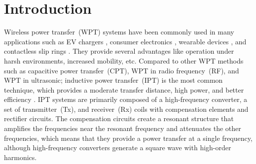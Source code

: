 \documentclass[journal]{IEEEtran}
\begin{document}
\section{Introduction}
Wireless power transfer~(WPT) systems have been commonly used in many applications such as EV chargers \cite{EV_charging}, consumer electronics \cite{consumer_electronics}, wearable devices \cite{wearable_devices}, and contactless slip rings \cite{CET}. 
They provide several advantages like operation under harsh environments, increased mobility, etc.
Compared to other WPT methods such as capacitive power transfer~(CPT), WPT in radio frequency~(RF), and WPT in ultrasonic;  inductive power transfer~(IPT) is the most common technique, which provides a moderate transfer distance, high power, and better efficiency \cite{CPT-RF}.
IPT systems are primarily composed of a high-frequency converter, a set of transmitter~(Tx), and receiver~(Rx) coils with compensation elements and rectifier circuits. 
The compensation circuits create a resonant structure that amplifies the frequencies near the resonant frequency and attenuates the other frequencies, which means that they provide a power transfer at a single frequency, although high-frequency converters generate a square wave with high-order harmonics.
\end{document}
